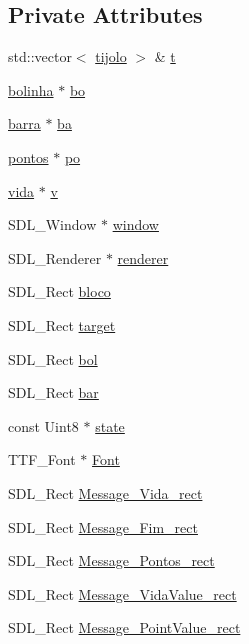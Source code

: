 \subsection*{Private Attributes}
\begin{DoxyCompactItemize}
\item 
std\+::vector$<$ \hyperlink{classtijolo}{tijolo} $>$ \& \hyperlink{classview_af57a3852a171948382275c534ede7987}{t}
\item 
\hyperlink{classbolinha}{bolinha} $\ast$ \hyperlink{classview_a9d44d190dd69b906bfeaac4559ee454e}{bo}
\item 
\hyperlink{classbarra}{barra} $\ast$ \hyperlink{classview_a0fd146110ca95e73f43c1dbda5a41294}{ba}
\item 
\hyperlink{classpontos}{pontos} $\ast$ \hyperlink{classview_a8dc345a9799a79220ecca66c4cd3e8ff}{po}
\item 
\hyperlink{classvida}{vida} $\ast$ \hyperlink{classview_ae0f8e281f5f7937d84f435437ce03546}{v}
\item 
S\+D\+L\+\_\+\+Window $\ast$ \hyperlink{classview_ade09c2dbabd1bf59ffaf625156c514f0}{window}
\item 
S\+D\+L\+\_\+\+Renderer $\ast$ \hyperlink{classview_a8d7b3ec0a0641d24cdc3b04949f5df45}{renderer}
\item 
S\+D\+L\+\_\+\+Rect \hyperlink{classview_ae22fb0558e890ff6ace089b603e2d6d8}{bloco}
\item 
S\+D\+L\+\_\+\+Rect \hyperlink{classview_a49a628eedba666db008f8c07b96e3a51}{target}
\item 
S\+D\+L\+\_\+\+Rect \hyperlink{classview_a72e360ef18105e2c565f17be3768027d}{bol}
\item 
S\+D\+L\+\_\+\+Rect \hyperlink{classview_a9c94bf9b55b5c24c5a9289d82a969ebb}{bar}
\item 
const Uint8 $\ast$ \hyperlink{classview_a6fd7fc350d9ad94dfd47e324b107e8ce}{state}
\item 
T\+T\+F\+\_\+\+Font $\ast$ \hyperlink{classview_ad17acebf948f7f42aa7cb8f88a38fe21}{Font}
\item 
S\+D\+L\+\_\+\+Rect \hyperlink{classview_af1b48d8a8f7f9e16800f9d842717ed2c}{Message\+\_\+\+Vida\+\_\+rect}
\item 
S\+D\+L\+\_\+\+Rect \hyperlink{classview_aba853e73ed61ec0078ff6e56bb57e702}{Message\+\_\+\+Fim\+\_\+rect}
\item 
S\+D\+L\+\_\+\+Rect \hyperlink{classview_ada3fc542a5e8b9d9e002665b37af781b}{Message\+\_\+\+Pontos\+\_\+rect}
\item 
S\+D\+L\+\_\+\+Rect \hyperlink{classview_a1a7059536cb8e091ff7d4a4f2526bcce}{Message\+\_\+\+Vida\+Value\+\_\+rect}
\item 
S\+D\+L\+\_\+\+Rect \hyperlink{classview_ade4cd2992600a54f7cb1f9f20876cd75}{Message\+\_\+\+Point\+Value\+\_\+rect}
\end{DoxyCompactItemize}


